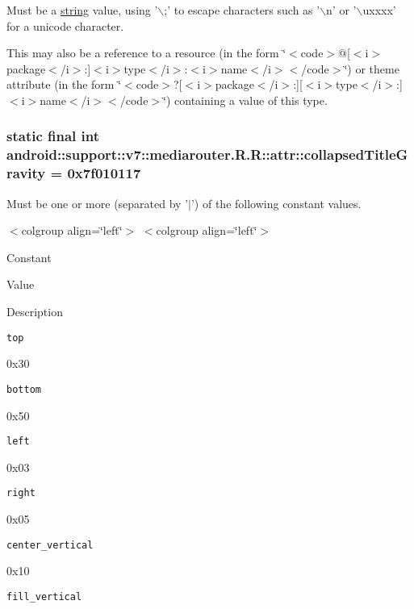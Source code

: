Must be a \hyperlink{classandroid_1_1support_1_1v7_1_1mediarouter_1_1_r_1_1string}{string} value, using '$\backslash$;' to escape characters such as '$\backslash$n' or '$\backslash$uxxxx' for a unicode character. 

This may also be a reference to a resource (in the form \char`\"{}$<$code$>$@\mbox{[}$<$i$>$package$<$/i$>$:\mbox{]}$<$i$>$type$<$/i$>$:$<$i$>$name$<$/i$>$$<$/code$>$\char`\"{}) or theme attribute (in the form \char`\"{}$<$code$>$?\mbox{[}$<$i$>$package$<$/i$>$:\mbox{]}\mbox{[}$<$i$>$type$<$/i$>$:\mbox{]}$<$i$>$name$<$/i$>$$<$/code$>$\char`\"{}) containing a value of this type. \hypertarget{classandroid_1_1support_1_1v7_1_1mediarouter_1_1_r_1_1attr_f63ce184717aa440f4dbbbcc842be341}{
\subsubsection[{collapsedTitleGravity}]{\setlength{\rightskip}{0pt plus 5cm}static final int android::support::v7::mediarouter.R.R::attr::collapsedTitleGravity = 0x7f010117}}
\label{classandroid_1_1support_1_1v7_1_1mediarouter_1_1_r_1_1attr_f63ce184717aa440f4dbbbcc842be341}


Must be one or more (separated by '$|$') of the following constant values. \begin{TabularC}{0}
\hline
\end{TabularC}
$<$colgroup align=\char`\"{}left\char`\"{}$>$ $<$colgroup align=\char`\"{}left\char`\"{}$>$ 

Constant

Value

Description 

{\tt top}

0x30

{\tt bottom}

0x50

{\tt left}

0x03

{\tt right}

0x05

{\tt center\_\-vertical}

0x10

{\tt fill\_\-vertical}

